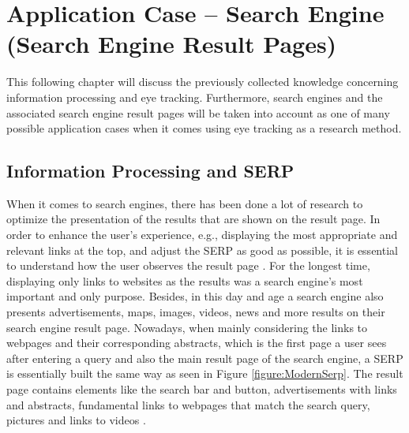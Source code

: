 \section{Application Case -- Search Engine (Search Engine Result Pages)}
\label{section:SearchEngine}
This following chapter will discuss the previously collected knowledge concerning information processing and eye tracking. Furthermore, search engines and the associated search engine result pages will be taken into account as one of many possible application cases when it comes using eye tracking as a research method.

\subsection{Information Processing and SERP}
\label{subsection:ReadingSERP}
When it comes to search engines, there has been done a lot of research to optimize the presentation of the results that are shown on the result page.  In order to enhance the user's experience, e.g., displaying the most appropriate and relevant links at the top, and adjust the SERP as good as possible, it is essential to understand how the user observes the result page \autocite{buscher2010good, liu2015influence}.
For the longest time, displaying only links to websites as the results was a search engine's most important and only purpose. Besides, in this day and age a search engine also presents advertisements, maps, images, videos, news and more results on their search engine result page. Nowadays, when mainly considering the links to webpages and their corresponding abstracts, which is the first page a user sees after entering a query and also the main result page of the search engine, a SERP is essentially built the same way as seen in Figure \ref{figure:ModernSerp}.
The result page contains elements like the search bar and button, advertisements with links and abstracts, fundamental links to webpages that match the search query, pictures and links to videos \autocite{wang2016beyond}.

